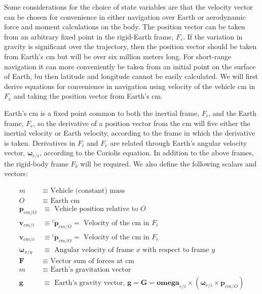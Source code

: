 Some considerations for the choice of state variables are that the velocity vector can be chosen for convenience in either navigation over Earth or aerodynamic force and moment calculations on the body. The position vector can be taken from an arbitrary fixed point in the rigid-Earth frame, \(F_{e}\). If the variation in gravity is significant over the trajectory, then the position vector should be taken from Earth's cm but will be over six million meters long. For short-range navigation it can more conveniently be taken from an initial point on the surface of Earth, bu then latitude and longitude cannot be easily calculated. We will first derive equations for convenience in navigation using velocity of the vehicle cm in \(F_{e}\) and taking the position vector from Earth's cm.

Earth's cm is a fixed point common to both the inertial frame, \(F_{i}\), and the Earth frame, \(F_{e}\), so the derivative of a position vector from the cm will five either the inertial velocity or Earth velocity, according to the frame in which the derivative is taken. Derivatives in \(F_{i}\) and \(F_{e}\) are related through Earth's angular velocity vector, \(\mathbf{\omega}_{e/i}\), according to the Coriolis equation. In addition to the above frames, the rigid-body frame \(F_{b}\) will be required. We also define the following scalars and vectors:

\begin{align*}
    m &\equiv \text{ Vehicle (constant) mass} \\
    O &\equiv \text{ Earth cm} \\
    \mathbf{p}_{cm/O} &\equiv \text{ Vehicle position relative to }O \\
    \mathbf{v}_{cm/i} &\equiv {^{i}\dot{\mathbf{p}}_{cm/O}} = \text{ Velocity of the cm in }F_{i} \\
    \mathbf{v}_{cm/e} &\equiv {^{i}\dot{\mathbf{p}}_{cm/O}} = \text{ Velocity of the cm in }F_{e}  \\
    \mathbf{\omega}_{x/y} &\equiv \text{ Angular velocity of frame \(x\) with respect to frame \(y\)} \\
    \mathbf{F} &\equiv \text{ Vector sum of forces at cm} \\
    m &\equiv \text{ Earth's gravitation vector} \\
    \mathbf{g} &\equiv \text{ Earth's gravity vector, }\mathbf{g} = \mathbf{G} = \mathbf{omega}_{e/i} \times \left( \mathbf{\omega}_{e/i} \times  \mathbf{p}_{cm/O} \right) \\
\end{align*}

